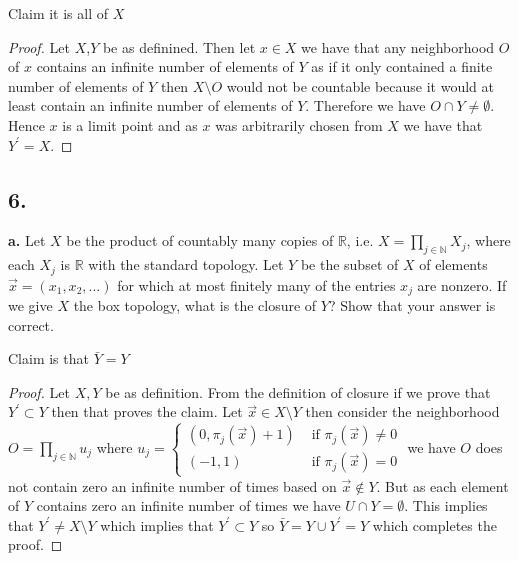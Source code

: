 \documentclass{amsart}
\theoremstyle{plain}
\theoremstyle{definition}
\theoremstyle{remark}
\begin{document}
Claim it is all of $X$ 

\begin{proof}
    Let $X$,$Y$ be as definined. Then let $x\in X$ we have that any neighborhood $O$ of $x$ contains an infinite number of elements of $Y$ as if it only contained a finite number of elements of $Y$ then $X\setminus O$ would not be countable because it would at least contain an infinite number of elements of $Y$. Therefore we have $O\cap Y\not = \emptyset$. Hence $x$ is a limit point and as $x$ was arbitrarily chosen from $X$ we have that $Y^\prime=X$.
\end{proof}

\vspace{.15in}

\noindent
\subsection*{6.} 

{\bfseries a.} Let $X$ be the product of countably many copies of $\mathbb R$, i.e. $X = \prod _{j\in \mathbb N } X_j$, where each $X_j$ is $\mathbb R$ with the standard topology. Let $Y$ be the subset of $X$ of elements $\vec{x} = ( x_1 , x_2 , . . . )$ for which at most finitely many of the entries $x_j$ are nonzero. If we give $X$ the box topology, what is the closure of $Y$? Show that your answer is correct. 

Claim is that $\bar Y=Y$

\begin{proof}
    Let $X,Y$ be as definition. From the definition of closure if we prove that $Y^\prime \subset Y$ then that proves the claim. Let  $\vec x\in X\setminus Y$ then consider the neighborhood $O=\prod_{j\in \mathbb{N}}u_j$ where $u_j=\begin{cases}
        (0,\pi_j(\vec x)+1)& \text{ if } \pi_j(\vec x)\not =0\\
        (-1,1) & \text{ if } \pi_j(\vec x) = 0
    \end{cases}$
    we have $O$ does not contain zero an infinite number of times based on $\vec x\not \in Y$. But as each element of $Y$ contains zero an infinite number of times we have $U\cap Y=\emptyset$. This implies that $Y^\prime \not = X\setminus Y$ which implies that $Y^\prime\subset Y$ so $\bar Y=Y\cup Y^\prime = Y$ which completes the proof. 



\end{proof}


\vspace{.1in}
\end{document}
